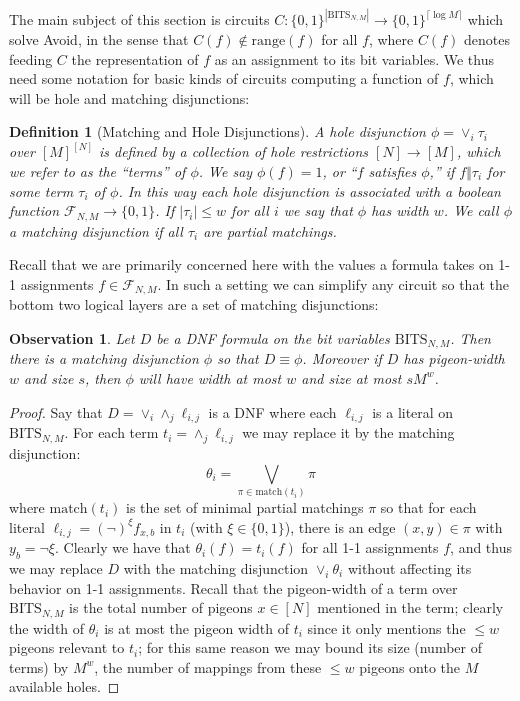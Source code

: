 \documentclass[11pt]{article}
\newtheorem{definition}{Definition}
\newtheorem{observation}{Observation}
\newcommand{\todo}[1]{\textcolor{red}{TODO: #1}}
\newcommand{\B}{\{0,1\}}
\newcommand{\rng}{\mathrm{range}}
\begin{document}
The main subject of this section is circuits $C: \B^{|\mathrm{BITS}_{N,M}|} \to \B^{\lceil \log M \rceil}$ which solve Avoid, in the sense that $C(f) \notin \rng(f)$ for all $f$, where $C(f)$ denotes feeding $C$ the representation of $f$ as an assignment to its bit variables. We thus need some notation for basic kinds of circuits computing a function of $f$, which will be hole and matching disjunctions:
\begin{definition}[Matching and Hole Disjunctions]
A hole disjunction $\phi = \lor_i \tau_i$ over $[M]^{[N]}$ is defined by a collection of hole restrictions $[N] \to [M]$, which we refer to as the ``terms'' of $\phi$. We say $\phi(f)=1$, or ``$f$ satisfies $\phi$,'' if $f \Vert \tau_i$ for some term $\tau_i$ of $\phi$. In this way each hole disjunction is associated with a boolean function $\mathcal{F}_{N,M} \to \B$. If $|\tau_i|\leq w$ for all $i$ we say that $\phi$ has width $w$. We call $\phi$ a matching disjunction if all $\tau_i$ are partial matchings.

\end{definition}
Recall that we are primarily concerned here with the values a formula takes on 1-1 assignments $f \in \mathcal{F}_{N,M}$. In such a setting we can simplify any circuit so that the bottom two logical layers are a set of matching disjunctions:
\begin{observation}\label{obs:matching-conversion}
Let $D$ be a DNF formula on the bit variables $\mathrm{BITS}_{N,M}$. Then there is a matching disjunction $\phi$ so that $D \equiv \phi$. Moreover if $D$ has pigeon-width $w$ and size $s$, then $\phi$ will have width at most $w$ and size at most $sM^w$.
\end{observation}

\begin{proof}
Say that $D = \lor_i \land_j \ell_{i,j}$ is a DNF where each $\ell_{i,j}$ is a literal on $\mathrm{BITS}_{N,M}$. For each term $t_i = \land_j \ell_{i,j}$ we may replace it by the matching disjunction:
\[
\theta_i = \bigvee_{\pi \in \mathrm{match}(t_i)} \pi
\]
where $\mathrm{match}(t_i)$ is the set of minimal partial matchings $\pi$ so that for each literal $\ell_{i,j} = (\lnot)^{\xi} f_{x,b}$ in $t_i$ (with $\xi \in \B$), there is an edge $(x,y) \in\pi$ with $y_b = \lnot \xi$. Clearly we have that $\theta_i(f) = t_i(f)$ for all 1-1 assignments $f$, and thus we may replace $D$ with the matching disjunction $\lor_i \theta_i$ without affecting its behavior on 1-1 assignments. Recall that the pigeon-width of a term over $\mathrm{BITS}_{N,M}$ is the total number of pigeons $x \in [N]$ mentioned in the term; clearly the width of $\theta_i$ is at most the pigeon width of $t_i$ since it only mentions the $\leq w$ pigeons relevant to $t_i$; for this same reason we may bound its size (number of terms) by $M^w$, the number of mappings from these $\leq w$ pigeons onto the $M$ available holes.
\end{proof}
\end{document}
